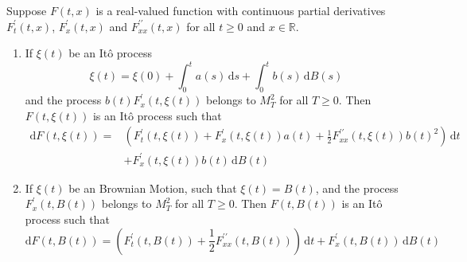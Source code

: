 \begin{theorem}[It\^o Formula]
    Suppose $F\left(t,x\right)$ is a real-valued function with continuous partial derivatives $F_{t}^{\prime}\left(t,x\right)$, $F_{x}^{\prime}\left(t,x\right)$ and $F_{xx}^{\prime\prime}\left(t,x\right)$ for all $t\geq 0$ and $x\in\mathbb{R}$.
    \begin{enumerate}
        \item If $\xi(t)$ be an It\^o process
              \begin{equation*}
                  \xi(t)=\xi(0)+\int_{0}^{t}a(s)\,\mathrm{d}s+\int_{0}^{t}b(s)\,\mathrm{d}B(s)
              \end{equation*}
              and the process $b(t)F_{x}^{\prime}(t,\xi(t))$ belongs to $M_{T}^{2}$ for all $T\geq 0$. Then $F(t,\xi(t))$ is an It\^o process such that
              \begin{equation}
                  \begin{aligned}
                      \mathrm{d}F(t,\xi(t))= & \left(F_{t}^{\prime}(t,\xi(t))+F_{x}^{\prime}(t,\xi(t))a(t)+\frac{1}{2}F_{xx}^{\prime\prime}(t,\xi(t))b(t)^{2}\right)\,\mathrm{d}t \\
                                             & +F_{x}^{\prime}(t,\xi(t))b(t)\,\mathrm{d}B(t)
                  \end{aligned}
              \end{equation}
        \item If $\xi(t)$ be an Brownian Motion, such that $\xi(t)=B(t)$, and the process $F_{x}^{\prime}(t,B(t))$ belongs to $M_{T}^{2}$ for all $T \geq 0$. Then $F(t,B(t))$ is an It\^o process such that
              \begin{equation}
                  \mathrm{d}F(t,B(t))=\left(F_{t}^{\prime}(t,B(t))+\frac{1}{2}F_{xx}^{\prime\prime}(t,B(t))\right)\,\mathrm{d}t+F_{x}^{\prime}(t,B(t))\,\mathrm{d}B(t)
              \end{equation}
    \end{enumerate}
\end{theorem}

